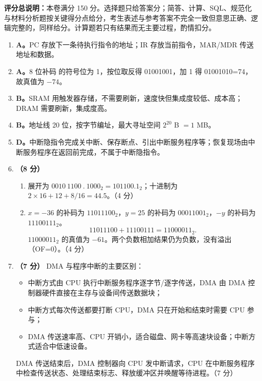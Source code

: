\documentclass[a4paper,11pt]{article}
\begin{document}

\noindent\textbf{评分总说明：}本卷满分 150 分。选择题只给答案分；简答、计算、SQL、规范化与材料分析题按关键得分点给分，考生表述与参考答案不完全一致但意思正确、逻辑完整的，同样给分。计算题若只有结果而无主要过程，酌情扣分。


\begin{enumerate}[start=1, label=\textbf{\arabic*.}, leftmargin=2.4em, itemsep=0.45em]

\item \textbf{A。}PC 存放下一条待执行指令的地址；IR 存放当前指令，MAR/MDR 传送地址和数据。

\item \textbf{A。}8 位补码  的符号位为 1，按位取反得 01001001，加 1 得 01001010=74，故真值为 $-74$。

\item \textbf{B。}SRAM 用触发器存储，不需要刷新，速度快但集成度较低、成本高；DRAM 需要刷新，集成度高。

\item \textbf{B。}地址线 20 位，按字节编址，最大寻址空间 $2^{20}$ B $=1$ MB。

\item \textbf{D。}中断隐指令完成关中断、保存断点、引出中断服务程序等；恢复现场由中断服务程序在返回前完成，不属于中断隐指令。

\item \textbf{（8 分）}
\begin{enumerate}[label=（\arabic*）, leftmargin=2.2em, itemsep=1pt]
  \item {} 展开为 $0010\ 1100\ .\ 1000_2=101100.1_2$；十进制为 $2\times16+12+8/16=44.5$。\hfill（4 分）
  \item $x=-36$ 的补码为 $11011100_2$，$y=25$ 的补码为 $00011001_2$，$-y$ 的补码为 $11100111_2$。
  \[
  11011100+11100111=11000011_2.
  \]
  $11000011_2$ 的真值为 $-61$。两个负数相加结果仍为负数，没有溢出（OF=0）。\hfill（4 分）
\end{enumerate}

\item \textbf{（7 分）}
DMA 与程序中断的主要区别：
\begin{itemize}[leftmargin=1.8em, itemsep=1pt]
  \item 中断方式由 CPU 执行中断服务程序逐字节/逐字传送，DMA 由 DMA 控制器硬件直接在主存与设备间传送数据块；
  \item 中断方式每次传送都要打断 CPU，DMA 只在开始和结束时需要 CPU 参与；
  \item DMA 传送速率高、CPU 开销小，适合磁盘、网卡等高速块设备；中断方式适合中低速设备。
\end{itemize}
DMA 传送结束后，DMA 控制器向 CPU 发中断请求，CPU 在中断服务程序中检查传送状态、处理结束标志、释放缓冲区并唤醒等待进程。\hfill（7 分）


\end{enumerate}
\end{document}
